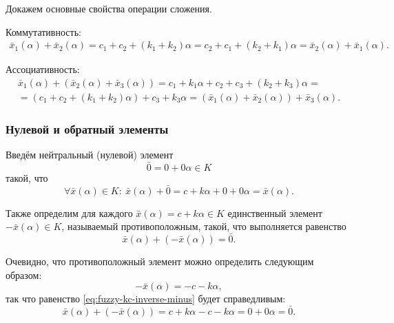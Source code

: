Докажем основные свойства операции сложения.

Коммутативность:
\begin{gather*}
\bar{x}_1\left( \alpha \right)+\bar{x}_2\left( \alpha \right)=c_1+c_2+\left(k_1+k_2\right)\alpha=c_2+c_1+\left(k_2+k_1 \right)\alpha =\bar{x}_2\left(\alpha \right)+\bar{x}_1\left(\alpha \right).
\end{gather*}

Ассоциативность:
\begin{gather*}
  \bar{x}_1\left(\alpha \right)+\left(\bar{x}_2\left(\alpha \right)+\bar{x}_3\left(\alpha \right) \right)=c_1+k_1\alpha +c_2+c_3+\left(k_2+k_3\right)\alpha={} \\ 
  {}=\left(c_1+c_2+\left(k_1+k_2\right)\alpha \right)+c_3+k_3\alpha =\left(\bar{x}_1\left(\alpha \right)+\bar{x}_2\left(\alpha \right) \right)+\bar{x}_3\left(\alpha \right).
\end{gather*}

\subsubsection*{Нулевой и обратный элементы}

Введём нейтральный (нулевой) элемент
\begin{equation}
\label{eq:fuzzy-kc-zero}
	\bar{0}=0+0\alpha \in K
\end{equation}
такой, что 
\begin{equation}
\label{eq:fuzzy-kc-zeroprop}
	\forall \bar{x}(\alpha )\in K:\ \bar{x}(\alpha )+\bar{0}=c+k\alpha +0+0\alpha =\bar{x}(\alpha ).
\end{equation}

Также определим для каждого $\bar{x}\left( \alpha  \right)=c+k\alpha \in K$ единственный элемент $-\bar{x}\left(\alpha \right)\in K$, называемый противоположным, такой, что выполняется равенство
\begin{equation}
\label{eq:fuzzy-kc-inverse-minus}
	\bar{x}\left( \alpha  \right)+\left( -\bar{x}\left( \alpha  \right) \right)=\bar{0}.
\end{equation}

Очевидно, что противоположный элемент можно определить следующим образом:
\begin{equation*}
  -\bar{x}\left( \alpha  \right)=-c-k\alpha,
\end{equation*}
так что равенство \eqref{eq:fuzzy-kc-inverse-minus} будет справедливым:
\begin{equation*}
	\bar{x}\left( \alpha  \right)+\left( -\bar{x}\left( \alpha  \right) \right)=c+k\alpha -c-k\alpha =0+0\alpha =\bar{0}.
\end{equation*}

